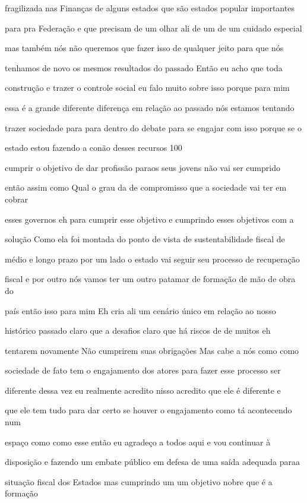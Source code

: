 \documentclass[a4paper,12pt]{article}
\begin{document}
fragilizada nas Finanças de alguns estados que são estados popular importantes

para pra Federação e que precisam de um olhar ali de um de um cuidado especial

mas também nós não queremos que fazer isso de qualquer jeito para que nós

tenhamos de novo os mesmos resultados do passado Então eu acho que toda

construção e trazer o controle social eu falo muito sobre isso porque para mim

essa é a grande diferente diferença em relação ao passado nós estamos tentando

trazer sociedade para para dentro do debate para se engajar com isso porque se o

estado estou fazendo a conão desses recursos 100%

cumprir o objetivo de dar profissão paraos seus jovens não vai ser cumprido

então assim como Qual o grau da de compromisso que a sociedade vai ter em cobrar

esses governos eh para cumprir esse objetivo e cumprindo esses objetivos com a

solução Como ela foi montada do ponto de vista de sustentabilidade fiscal de

médio e longo prazo por um lado o estado vai seguir seu processo de recuperação

fiscal e por outro nós vamos ter um outro patamar de formação de mão de obra do

país então isso para mim Eh cria ali um cenário único em relação ao nosso

histórico passado claro que a desafios claro que há riscos de de muitos eh

tentarem novamente Não cumprirem suas obrigações Mas cabe a nós como como

sociedade de fato tem o engajamento dos atores para fazer esse processo ser

diferente dessa vez eu realmente acredito nisso acredito que ele é diferente e

que ele tem tudo para dar certo se houver o engajamento como tá acontecendo num

espaço como como esse então eu agradeço a todos aqui e vou continuar à

disposição e fazendo um embate público em defesa de uma saída adequada paraa

situação fiscal dos Estados mas cumprindo um um objetivo nobre que é a formação
\end{document}
